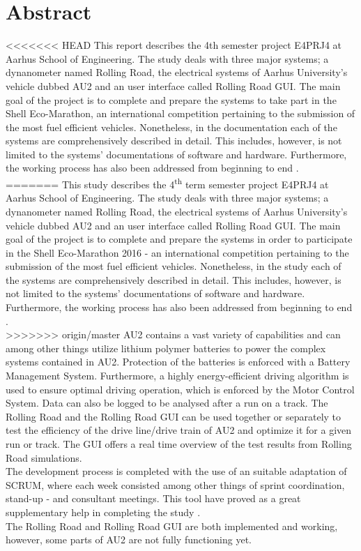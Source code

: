\chapter{Abstract}
<<<<<<< HEAD
This report describes the 4th semester project E4PRJ4 at Aarhus School of Engineering. The study deals with three major systems; a dynanometer named Rolling Road, the electrical systems of Aarhus University's vehicle dubbed AU2 and an user interface called Rolling Road GUI. The main goal of the project is to complete and prepare the systems to take part in the Shell Eco-Marathon, an international competition pertaining to the submission of the most fuel efficient vehicles. Nonetheless, in the documentation each of the systems are comprehensively described in detail. This includes, however, is not limited to the systems' documentations of software and hardware. Furthermore, the working process has also been addressed from beginning to end . \\
=======
This study describes the 4\textsuperscript{th} term semester project E4PRJ4 at Aarhus School of Engineering. The study deals with three major systems; a dynanometer named Rolling Road, the electrical systems of Aarhus University's vehicle dubbed AU2 and an user interface called Rolling Road GUI. The main goal of the project is to complete and prepare the systems in order to participate in the Shell Eco-Marathon 2016 - an international competition pertaining to the submission of the most fuel efficient vehicles. Nonetheless, in the study  each of the systems are comprehensively described in detail. This includes, however, is not limited to the systems' documentations of  software and hardware. Furthermore, the working process has also been addressed from beginning to end . \\
>>>>>>> origin/master
AU2 contains a vast variety of capabilities and can among other things utilize lithium polymer batteries to power the complex systems contained in AU2.
Protection of the batteries is enforced with a Battery Management System. Furthermore, a highly energy-efficient driving algorithm is used to ensure optimal driving operation, which is enforced by the Motor Control System. Data can also be logged to be analysed after a run on a track.
The Rolling Road and the Rolling Road GUI can be used together or separately to test the efficiency of the drive line/drive train of AU2 and optimize it for a given run or track. The GUI offers a real time overview of the test results from Rolling Road simulations.\\

The development process is completed with the use of an suitable adaptation of SCRUM, where each week consisted among other things of sprint coordination, stand-up - and consultant meetings. This tool have proved as a great
supplementary help in completing the study .\\
The Rolling Road and Rolling Road GUI are both implemented and working, however, some parts of AU2 are not fully functioning yet.